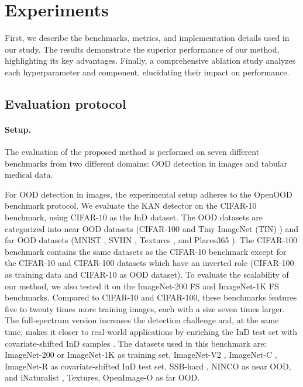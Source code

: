 \section{Experiments}
First, we describe the benchmarks, metrics, and implementation details used in our study.  
The results demonstrate the superior performance of our method, highlighting its key advantages. 
Finally, a comprehensive ablation study analyzes each hyperparameter and component, elucidating their impact on performance.

\subsection{Evaluation protocol}

\paragraph{Setup.} 
The evaluation of the proposed method is performed on seven different benchmarks from two different domains: OOD detection in images and tabular medical data. 

For OOD detection in images, the experimental setup adheres to the OpenOOD \citep{NEURIPS2022_d201587e} benchmark protocol. 
We evaluate the KAN detector on the CIFAR-10 benchmark, using CIFAR-10 \citep{cifar10dataset} as the InD dataset. 
The OOD datasets are categorized into near OOD datasets (CIFAR-100 \citep{cifar100dataset} and Tiny ImageNet (TIN) \citep{le2015tiny}) and far OOD datasets (MNIST \citep{6296535}, SVHN \citep{37648}, Textures \citep{Cimpoi_2014_CVPR}, and Places365 \citep{7968387}). 
The CIFAR-100 benchmark contains the same datasets as the CIFAR-10 benchmark except for the CIFAR-10 and CIFAR-100 datasets which have an inverted role (CIFAR-100 as training data and CIFAR-10 as OOD dataset).
To evaluate the scalability of our method, we also tested it on the ImageNet-200 FS and ImageNet-1K FS benchmarks. 
Compared to CIFAR-10 and CIFAR-100, these benchmarks features five to twenty times more training images, each with a size seven times larger.
The full-spectrum version increases the detection challenge and, at the same time, makes it closer to real-world applications by enriching the InD test set with covariate-shifted InD samples \citep{Yang2023}.
The datasets used in this benchmark are: ImageNet-200 or ImageNet-1K \citep{5206848} as training set, ImageNet-V2 \citep{conf/icml/RechtRSS19}, ImageNet-C \citep{hendrycks2019robustness}, ImageNet-R \citep{hendrycks2021many} as covariate-shifted InD test set, SSB-hard \citep{vaze2022openset}, NINCO \citep{bitterwolf2023outfixingimagenetoutofdistribution} as near OOD, and iNaturalist \citep{8579012}, Textures, OpenImage-O \citep{haoqi2022vim} as far OOD.

